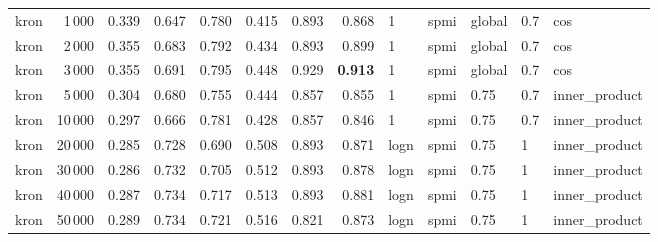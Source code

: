\begin{tabular}{lrrrrrrrlllll}
    kron &            1\,000 &      0.339 &  0.647 &  0.780 &  0.415 &      0.893 &      0.868 &     1 &   spmi &  global &  0.7 &            cos \\
    kron &            2\,000 &      0.355 &  0.683 &  0.792 &  0.434 &      0.893 &      0.899 &     1 &   spmi &  global &  0.7 &            cos \\
    kron &            3\,000 &      0.355 &  0.691 &  0.795 &  0.448 &      0.929 &      \textbf{0.913} &     1 &   spmi &  global &  0.7 &            cos \\
    kron &            5\,000 &      0.304 &  0.680 &  0.755 &  0.444 &      0.857 &      0.855 &     1 &   spmi &    0.75 &  0.7 &  inner\_product \\
    kron &           10\,000 &      0.297 &  0.666 &  0.781 &  0.428 &      0.857 &      0.846 &     1 &   spmi &    0.75 &  0.7 &  inner\_product \\
    kron &           20\,000 &      0.285 &  0.728 &  0.690 &  0.508 &      0.893 &      0.871 &  logn &   spmi &    0.75 &    1 &  inner\_product \\
    kron &           30\,000 &      0.286 &  0.732 &  0.705 &  0.512 &      0.893 &      0.878 &  logn &   spmi &    0.75 &    1 &  inner\_product \\
    kron &           40\,000 &      0.287 &  0.734 &  0.717 &  0.513 &      0.893 &      0.881 &  logn &   spmi &    0.75 &    1 &  inner\_product \\
    kron &           50\,000 &      0.289 &  0.734 &  0.721 &  0.516 &      0.821 &      0.873 &  logn &   spmi &    0.75 &    1 &  inner\_product \\
\bottomrule
\end{tabular}
